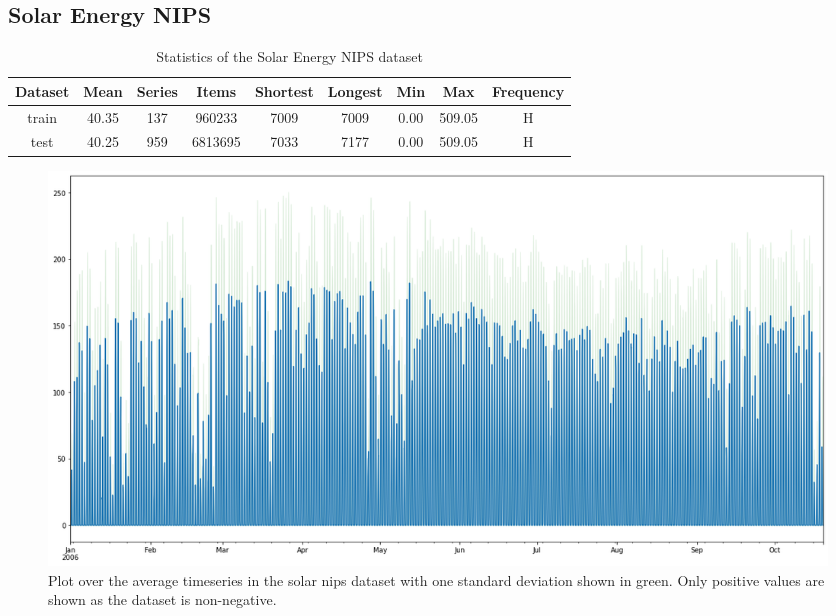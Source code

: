 \clearpage
\subsection{Solar Energy NIPS}
\begin{table}[htb]
  \begin{tabular}{||c | c c c c c c c c ||}
    \hline
    Dataset & Mean  & Series & Items   & Shortest & Longest & Min  & Max    & Frequency \\ [0.5ex]
    \hline\hline
    train   & 40.35 & 137    & 960233  & 7009     & 7009    & 0.00 & 509.05 & H         \\
    \hline
    test    & 40.25 & 959    & 6813695 & 7033     & 7177    & 0.00 & 509.05 & H         \\
    \hline
  \end{tabular}
  \caption{Statistics of the Solar Energy NIPS dataset}
\end{table}

\begin{figure}[htb]
  \centering
  \includegraphics[width=\linewidth]{./img/solar_nips_plot.png}
  \caption{Plot over the average timeseries in the solar nips dataset with one standard deviation shown in green. Only positive values are shown as the dataset is non-negative.}
  \label{fig:solar_nips_plot}
  \endminipage\hfill
\end{figure}

